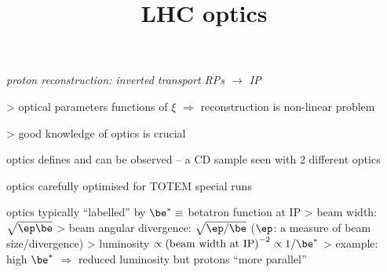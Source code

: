 
\vskip1mm	

\> \em{\cYe proton reconstruction\cFg}: inverted transport RPs $\longrightarrow$ IP

\>> optical parameters functions of $\xi$ $\Rightarrow$ reconstruction is non-linear problem

\>> \cLRe good knowledge of optics is crucial\cFg


\newpage %
\title{LHC optics}

\> optics defines  and  can be observed -- a CD sample seen with 2 different optics

\vskip2mm


\vfil
\> optics carefully optimised for TOTEM special runs

\vfil
\> optics typically ``labelled'' by \cLRe $\be^* \equiv$ betatron function at IP\cFg
\>> \cLRe beam width\cFg: $\sqrt{\ep \be}$
\>> \cLRe beam angular divergence\cFg: $\sqrt{\ep / \be}$ ($\ep$: a measure of beam size/divergence)
\>> luminosity $\propto \hbox{(beam width at IP)}^{-2} \propto 1/\be^*$
\>> example: \cYe high $\be^*$ $\Rightarrow$ reduced luminosity but protons ``more parallel''\cFg


